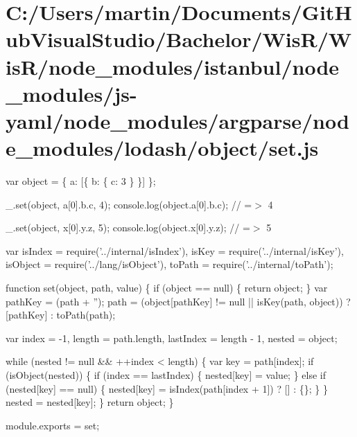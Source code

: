 \hypertarget{_c_1_2_users_2martin_2_documents_2_git_hub_visual_studio_2_bachelor_2_wis_r_2_wis_r_2node_module0bba656593aa25ce2588fe28a1129b69}{}\section{C\+:/\+Users/martin/\+Documents/\+Git\+Hub\+Visual\+Studio/\+Bachelor/\+Wis\+R/\+Wis\+R/node\+\_\+modules/istanbul/node\+\_\+modules/js-\/yaml/node\+\_\+modules/argparse/node\+\_\+modules/lodash/object/set.\+js}
var object = \{ \textquotesingle{}a\textquotesingle{}\+: \mbox{[}\{ \textquotesingle{}b\textquotesingle{}\+: \{ \textquotesingle{}c\textquotesingle{}\+: 3 \} \}\mbox{]} \};

\+\_\+.\+set(object, \textquotesingle{}a\mbox{[}0\mbox{]}.b.\+c\textquotesingle{}, 4); console.\+log(object.\+a\mbox{[}0\mbox{]}.b.\+c); // =$>$ 4

\+\_\+.\+set(object, \textquotesingle{}x\mbox{[}0\mbox{]}.y.\+z\textquotesingle{}, 5); console.\+log(object.\+x\mbox{[}0\mbox{]}.y.\+z); // =$>$ 5


\begin{DoxyCodeInclude}
var isIndex = require(\textcolor{stringliteral}{'../internal/isIndex'}),
    isKey = require(\textcolor{stringliteral}{'../internal/isKey'}),
    isObject = require(\textcolor{stringliteral}{'../lang/isObject'}),
    toPath = require(\textcolor{stringliteral}{'../internal/toPath'});

\textcolor{keyword}{function} set(\textcolor{keywordtype}{object}, path, value) \{
  \textcolor{keywordflow}{if} (\textcolor{keywordtype}{object} == null) \{
    \textcolor{keywordflow}{return} object;
  \}
  var pathKey = (path + \textcolor{stringliteral}{''});
  path = (\textcolor{keywordtype}{object}[pathKey] != null || isKey(path, \textcolor{keywordtype}{object})) ? [pathKey] : toPath(path);

  var index = -1,
      length = path.length,
      lastIndex = length - 1,
      nested = object;

  \textcolor{keywordflow}{while} (nested != null && ++index < length) \{
    var key = path[index];
    \textcolor{keywordflow}{if} (isObject(nested)) \{
      \textcolor{keywordflow}{if} (index == lastIndex) \{
        nested[key] = value;
      \} \textcolor{keywordflow}{else} \textcolor{keywordflow}{if} (nested[key] == null) \{
        nested[key] = isIndex(path[index + 1]) ? [] : \{\};
      \}
    \}
    nested = nested[key];
  \}
  \textcolor{keywordflow}{return} object;
\}

module.exports = set;
\end{DoxyCodeInclude}
 